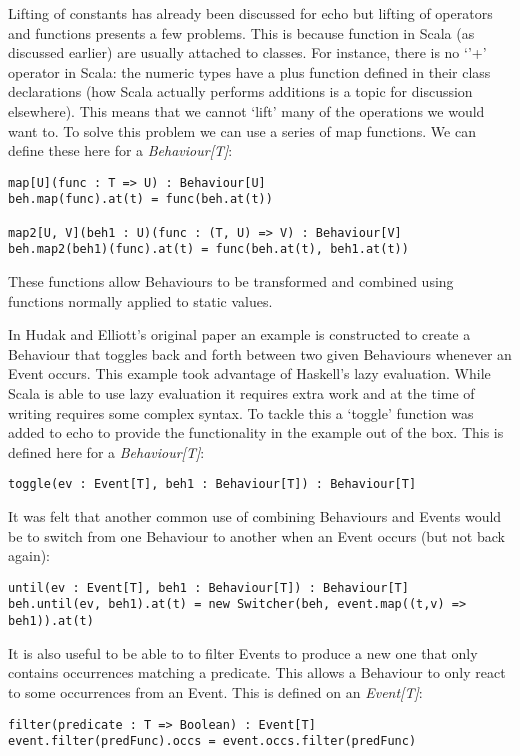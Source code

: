       Lifting of constants has already been discussed for echo but lifting of operators and
      functions presents a few problems. This is because function in Scala (as discussed earlier)
      are usually attached to classes. For instance, there is no `'+' operator in Scala: the numeric
      types have a plus function defined in their class declarations (how Scala actually performs additions
      is a topic for discussion elsewhere). This means that we cannot `lift' many of the operations we
      would want to. To solve this problem we can use a series of map functions. We can define these
      here for a \emph{Behaviour[T]}:

\begin{verbatim}
map[U](func : T => U) : Behaviour[U]
beh.map(func).at(t) = func(beh.at(t))

map2[U, V](beh1 : U)(func : (T, U) => V) : Behaviour[V]
beh.map2(beh1)(func).at(t) = func(beh.at(t), beh1.at(t))
\end{verbatim}        

      These functions allow Behaviours to be transformed and combined using functions
      normally applied to static values.
      
      In Hudak and Elliott's original paper an example is constructed to create a Behaviour
      that toggles back and forth between two given Behaviours whenever an Event occurs. This
      example took advantage of Haskell's lazy evaluation. While Scala is able to use lazy evaluation
      it requires extra work and at the time of writing requires some complex syntax. To tackle this
      a `toggle' function was added to echo to provide the functionality in the example out of the box.
      This is defined here for a \emph{Behaviour[T]}:
      
\begin{verbatim}
toggle(ev : Event[T], beh1 : Behaviour[T]) : Behaviour[T]
\end{verbatim}        
      
      It was felt that another common use of combining Behaviours and Events would be
      to switch from one Behaviour to another when an Event occurs (but not back again):

\begin{verbatim}
until(ev : Event[T], beh1 : Behaviour[T]) : Behaviour[T]
beh.until(ev, beh1).at(t) = new Switcher(beh, event.map((t,v) => beh1)).at(t)
\end{verbatim}        
      
      It is also useful to be able to to filter Events to produce a new one that only
      contains occurrences matching a predicate. This allows a Behaviour to only react
      to some occurrences from an Event. This is defined on an \emph{Event[T]}:

\begin{verbatim}
filter(predicate : T => Boolean) : Event[T]
event.filter(predFunc).occs = event.occs.filter(predFunc)
\end{verbatim}        
